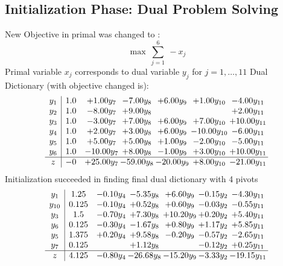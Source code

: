\documentclass[9pt]{article}
\begin{document}
\subsection{Initialization Phase: Dual Problem Solving}
New Objective in primal was changed to : \[ \max\ \sum_{j=1}^{6}\ - x_j \] 
Primal variable $x_j$ corresponds to dual variable $y_j$ for $j = 1,\ldots,11$
Dual Dictionary (with objective changed is): 
\[\begin{array}{c| c c@{\hskip 2pt} c@{\hskip 2pt} c@{\hskip 2pt} c@{\hskip 2pt} c@{\hskip 2pt} }
 y_{1}   &  1.0 & +  1.00 y_{7} & -7.00 y_{8} & +  6.00 y_{9} & +  1.00 y_{10} & -4.00 y_{11}\\
 y_{2}   &  1.0 & -8.00 y_{7} & +  9.00 y_{8} &    &   & +  2.00 y_{11}\\
 y_{3}   &  1.0 & -3.00 y_{7} & +  7.00 y_{8} & +  6.00 y_{9} & +  7.00 y_{10} & + 10.00 y_{11}\\
 y_{4}   &  1.0 & +  2.00 y_{7} & +  3.00 y_{8} & +  6.00 y_{9} & -10.00 y_{10} & -6.00 y_{11}\\
 y_{5}   &  1.0 & +  5.00 y_{7} & +  5.00 y_{8} & +  1.00 y_{9} & -2.00 y_{10} & -5.00 y_{11}\\
 y_{6}   &  1.0 & -10.00 y_{7} & +  8.00 y_{8} & -1.00 y_{9} & +  3.00 y_{10} & + 10.00 y_{11}\\
\hline
z    &  -0 & + 25.00 y_{7} & -59.00 y_{8} & -20.00 y_{9} & +  8.00 y_{10} & -21.00 y_{11}\\
\end{array}\]
Initialization succeeded in finding final dual dictionary with 4 pivots
\[\begin{array}{c| c c@{\hskip 2pt} c@{\hskip 2pt} c@{\hskip 2pt} c@{\hskip 2pt} c@{\hskip 2pt} }
 y_{1}   &  1.25 & -0.10 y_{4} & -5.35 y_{8} & +  6.60 y_{9} & -0.15 y_{2} & -4.30 y_{11}\\
 y_{10}   &  0.125 & -0.10 y_{4} & +  0.52 y_{8} & +  0.60 y_{9} & -0.03 y_{2} & -0.55 y_{11}\\
 y_{3}   &  1.5 & -0.70 y_{4} & +  7.30 y_{8} & + 10.20 y_{9} & +  0.20 y_{2} & +  5.40 y_{11}\\
 y_{6}   &  0.125 & -0.30 y_{4} & -1.67 y_{8} & +  0.80 y_{9} & +  1.17 y_{2} & +  5.85 y_{11}\\
 y_{5}   &  1.375 & +  0.20 y_{4} & +  9.58 y_{8} & -0.20 y_{9} & -0.57 y_{2} & -2.65 y_{11}\\
 y_{7}   &  0.125  &   & +  1.12 y_{8} &   & -0.12 y_{2} & +  0.25 y_{11}\\
\hline
z    &  4.125 & -0.80 y_{4} & -26.68 y_{8} & -15.20 y_{9} & -3.33 y_{2} & -19.15 y_{11}\\
\end{array}\]
\end{document}
